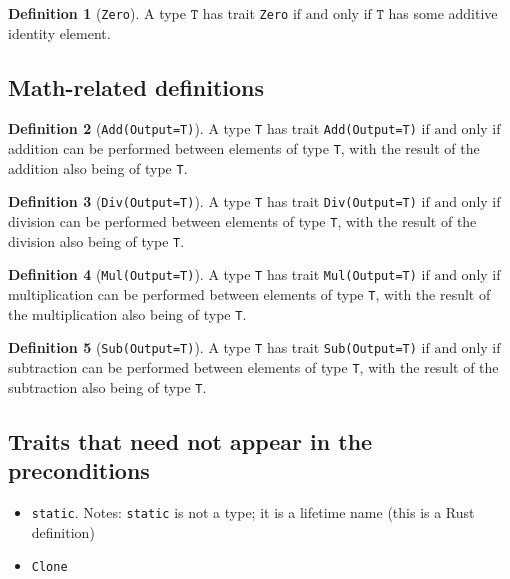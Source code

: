 \documentclass[11pt,a4paper]{article}
\theoremstyle{definition}
\newtheorem{definition}{Definition}[section]
\newcommand{\connor}[1]{{ {\color{teal}{(connor)~#1}}}}
\newcommand{\T}{\texttt{T}}
\newcommand{\iffText}{\text{if and only if}}
\begin{document}
\begin{definition}[\texttt{Zero}]
A type $\T$ has trait \texttt{Zero} $\iffText$ $\T$ has some additive identity element.
\end{definition}

\subsection{Math-related definitions}
\connor{Since these should probably have similar definitions, they are here for now (i.e. not alphabetized) since this is the first version, and it will be easier to make changes if they're all grouped together. They will be brought into the alphabetical list later.}

\begin{definition}[\texttt{Add(Output=T)}]
    A type \texttt{T} has trait \texttt{Add(Output=T)} $\iffText$ addition can be performed between elements of type \texttt{T}, with the result of the addition also being of type \texttt{T}.
\end{definition}

\begin{definition}[\texttt{Div(Output=T)}]
    A type \texttt{T} has trait \texttt{Div(Output=T)} $\iffText$ division can be performed between elements of type \texttt{T}, with the result of the division also being of type \texttt{T}.
\end{definition}

\begin{definition}[\texttt{Mul(Output=T)}]
    A type \texttt{T} has trait \texttt{Mul(Output=T)} $\iffText$ multiplication can be performed between elements of type \texttt{T}, with the result of the multiplication also being of type \texttt{T}.
\end{definition}

\begin{definition}[\texttt{Sub(Output=T)}]
    A type \texttt{T} has trait \texttt{Sub(Output=T)} $\iffText$ subtraction can be performed between elements of type \texttt{T}, with the result of the subtraction also being of type \texttt{T}.
\end{definition}

\subsection{Traits that need not appear in the preconditions}
\begin{itemize}
    \item \texttt{\textquotesingle static}. Notes: \texttt{\textquotesingle static} is not a type; it is a lifetime name (this is a Rust definition)
    \item \texttt{Clone}
\end{itemize}
\end{document}
